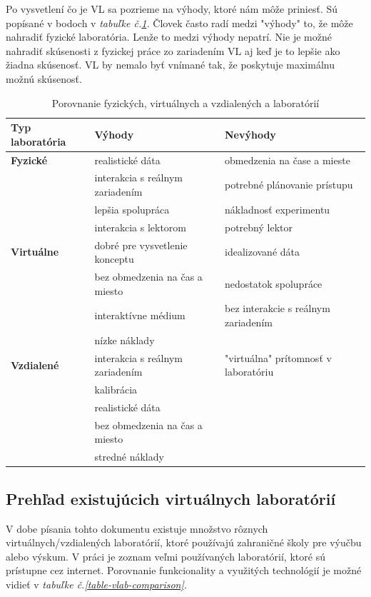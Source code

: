 Po vysvetlení čo je VL sa pozrieme na výhody, ktoré nám môže priniesť. Sú popísané v bodoch v \textit{tabuľke č.\ref{table-real-remote-virtual-laboratory}.}
Človek často radí medzi "výhody" to, že môže nahradiť fyzické laboratória. Lenže to medzi výhody nepatrí. Nie je možné nahradiť skúsenosti z fyzickej práce zo zariadením VL aj keď je to lepšie ako žiadna skúsenosť. VL by nemalo byť vnímané tak, že poskytuje maximálnu možnú skúsenosť.
\begin{table}[H]
\small
\begin{tabular}{l l l}
\hline
\textbf{Typ laboratória} & \textbf{Výhody}  & \textbf{Nevýhody} \\ \hline
\textbf{Fyzické} & realistické dáta & obmedzenia na čase a mieste \\
& interakcia s reálnym zariadením & potrebné plánovanie prístupu\\
& lepšia spolupráca & nákladnosť experimentu \\
& interakcia s lektorom & potrebný lektor \\ \hline
\textbf{Virtuálne} & dobré pre vysvetlenie konceptu &  idealizované dáta\\
& bez obmedzenia na čas a miesto &  nedostatok spolupráce  \\
& interaktívne médium & bez interakcie s reálnym zariadením \\
& nízke náklady & \\ \hline
\textbf{Vzdialené} & interakcia s reálnym zariadením &  "virtuálna" prítomnosť v laboratóriu \\
& kalibrácia & \\
& realistické dáta & \\
& bez obmedzenia na čas a miesto & \\
& stredné náklady & \\ \hline
\end{tabular}
\caption{Porovnanie fyzických, virtuálnych a vzdialených a laboratórií}
\label{table-real-remote-virtual-laboratory}
\end{table}

\subsection{Prehľad existujúcich virtuálnych laboratórií}
V dobe písania tohto dokumentu existuje množstvo rôznych virtuálnych/vzdialených laboratórií, ktoré používajú zahraničné školy pre výučbu alebo výskum. V práci \cite{vlabtablecomparison} je zoznam veľmi používaných laboratórií, ktoré sú prístupne cez internet. Porovnanie funkcionality a využitých technológií je možné vidieť v  \textit{tabuľke č.\ref{table-vlab-comparison}.}

